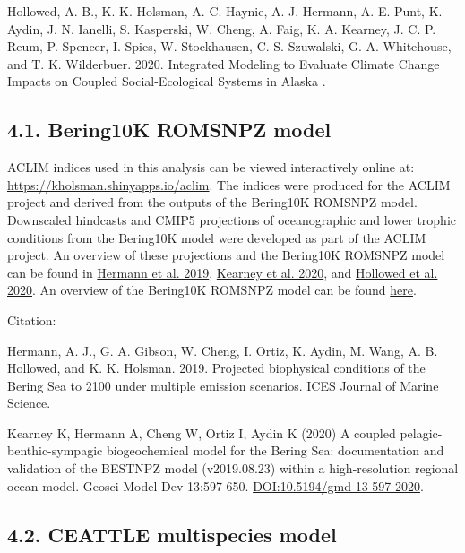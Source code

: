 \documentclass[]{article}
\begin{document}
Hollowed, A. B., K. K. Holsman, A. C. Haynie, A. J. Hermann, A. E. Punt,
K. Aydin, J. N. Ianelli, S. Kasperski, W. Cheng, A. Faig, K. A. Kearney,
J. C. P. Reum, P. Spencer, I. Spies, W. Stockhausen, C. S. Szuwalski, G.
A. Whitehouse, and T. K. Wilderbuer. 2020. Integrated Modeling to
Evaluate Climate Change Impacts on Coupled Social-Ecological Systems in
Alaska .

\subsection{4.1. Bering10K ROMSNPZ model}\label{bering10k-romsnpz-model}

ACLIM indices used in this analysis can be viewed interactively online
at: \url{https://kholsman.shinyapps.io/aclim}. The indices were produced
for the ACLIM project and derived from the outputs of the Bering10K
ROMSNPZ model. Downscaled hindcasts and CMIP5 projections of
oceanographic and lower trophic conditions from the Bering10K model were
developed as part of the ACLIM project. An overview of these projections
and the Bering10K ROMSNPZ model can be found in
\href{\%22https://academic.oup.com/icesjms/article/76/5/1280/5477847\%22}{Hermann
et al. 2019},
\href{\%22https://gmd.copernicus.org/articles/13/597/2020/\%22}{Kearney
et al. 2020}, and
\href{\%22https://www.frontiersin.org/articles/10.3389/fmars.2019.00775/full\%22}{Hollowed
et al. 2020}. An overview of the Bering10K ROMSNPZ model can be found
\href{\%22https://beringnpz.github.io/roms-bering-sea/intro/\%22}{here}.

Citation:

Hermann, A. J., G. A. Gibson, W. Cheng, I. Ortiz, K. Aydin, M. Wang, A.
B. Hollowed, and K. K. Holsman. 2019. Projected biophysical conditions
of the Bering Sea to 2100 under multiple emission scenarios. ICES
Journal of Marine Science.

Kearney K, Hermann A, Cheng W, Ortiz I, Aydin K (2020) A coupled
pelagic-benthic-sympagic biogeochemical model for the Bering Sea:
documentation and validation of the BESTNPZ model (v2019.08.23) within a
high-resolution regional ocean model. Geosci Model Dev 13:597-650.
\url{DOI:10.5194/gmd-13-597-2020}.

\subsection{4.2. CEATTLE multispecies
model}\label{ceattle-multispecies-model}
\end{document}
